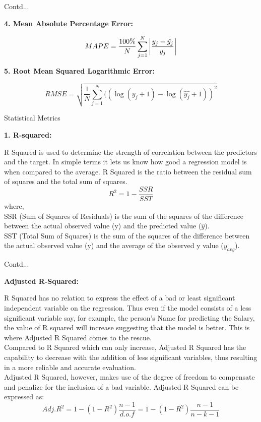 \documentclass{beamer}
\newcommand\myheading[1]{%
  \par\bigskip
  {\large\bfseries#1}\par\smallskip}
\begin{document}
\begin{frame}{Contd...}
	\begin{flushleft}
		\myheading{4. Mean Absolute Percentage Error:}
		\begin{equation*}
			MAPE = \frac{100\%}{N}\sum_{j=1}^{N}{\bigg{|}\frac{y_j - \hat{y_j}}{y_j}\bigg{|}}
		\end{equation*}
		\myheading{5. Root Mean Squared Logarithmic Error:}
		\begin{equation*}
			RMSE = \sqrt{\frac{1}{N}\sum_{j=1}^{N}((\log(y_j + 1) - \log(\hat{y_j} + 1))^2}
		\end{equation*}
	\end{flushleft}
\end{frame}

\begin{frame}{Statistical Metrics}
\begin{flushleft}
	\myheading{1. R-squared:}
	R Squared is used to determine the strength of correlation between the predictors and the target. In simple terms it lets us know how good a regression model is when compared to the average. R Squared is the ratio between the residual sum of squares and the total sum of squares.
	\begin{equation*}
		R^2 = 1 - \frac{SSR}{SST}
	\end{equation*}
	where,\\
	SSR (Sum of Squares of Residuals) is the sum of the squares of the difference between the actual observed value (y) and the predicted value ($\hat y$).\\
	SST (Total Sum of Squares) is the sum of the squares of the difference between the actual observed value (y) and the average of the observed y value ($y_{avg}$).
\end{flushleft}
\end{frame}

\begin{frame}{Contd...}
\begin{flushleft}
	\myheading{Adjusted R-Squared:}
	R Squared has no relation to express the effect of a bad or least significant independent variable on the regression. Thus even if the model consists of a less significant variable say, for example, the person’s Name for predicting the Salary, the value of R squared will increase suggesting that the model is better. This is where Adjusted R Squared comes to the rescue.\\
\vspace{5pt}
Compared to R Squared which can only increase, Adjusted R Squared has the capability to decrease with the addition of less significant variables, thus resulting in a more reliable and accurate evaluation.\\
\vspace{5pt}
Adjusted R Squared, however, makes use of the degree of freedom to compensate and penalize for the inclusion of a bad variable. Adjusted R Squared can be expressed as:
\begin{equation*}
	Adj. R^2 = 1 - (1 - R^2) \frac{n - 1}{d.o.f} = 1 - (1 - R^2) \frac{n - 1}{n - k - 1}
\end{equation*}
\end{flushleft}
\end{frame}
\end{document}
